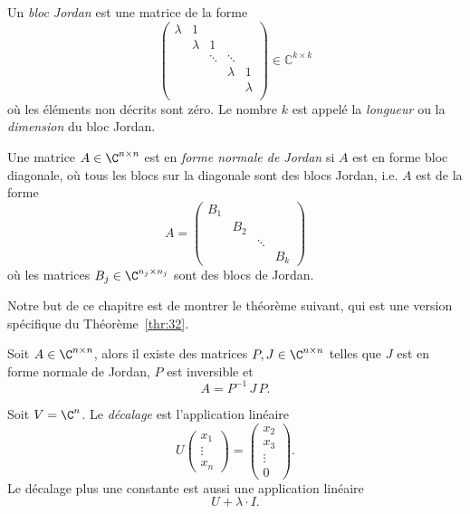 \begin{definition}
  Un \emph{bloc Jordan} est une matrice de la forme 
  \begin{displaymath}
    \begin{pmatrix}
      λ & 1 \\
        & λ & 1 \\
        &   & \ddots & \ddots \\ 
        &   &             & λ & 1 \\
        &   &         &  & λ  \\
    \end{pmatrix} ∈ ℂ^{k ×k} 
  \end{displaymath}
où les éléments non décrits sont zéro. Le nombre $k$ est appelé la \emph{longueur} ou la \emph{dimension} du bloc Jordan. 

Une matrice $A \in \C^{n \times n}$ est en \emph{forme normale de Jordan} si $A$ est en forme bloc diagonale, où tous les blocs sur la diagonale sont des blocs Jordan, i.e. $A$ est de la forme
\begin{displaymath}
  A =
  \begin{pmatrix}
    B_1 \\
        & B_2 \\
        &    & \ddots \\
        &    &       & B_k
  \end{pmatrix}
\end{displaymath}
où les matrices $B_j \in \C^{n_j\times n_j}$ sont des blocs de Jordan. 
\end{definition}


Notre but de ce chapitre  est de montrer le théorème suivant, qui est une version spécifique du  Théorème~\ref{thr:32}.

\begin{theorem}
  \label{thr:41}
  Soit $A \in \C^{n \times n}$, alors il existe des matrices $P,J \in \C^{n \times n}$ telles que $J$ est en forme normale de Jordan, $P$ est inversible et 
  \begin{displaymath}
    A = P^{-1} \,J \,P. 
  \end{displaymath}
\end{theorem}

\begin{definition}
  \label{def:36}
  Soit $V  = \C^n$. Le \emph{décalage}  est l'application linéaire 
  \begin{displaymath}
    U
    \begin{pmatrix}
      x_1 \\ \vdots \\ x_n
    \end{pmatrix}
     = 
     \begin{pmatrix}
       x_2 \\ x_3 \\ \vdots \\ 0
     \end{pmatrix}. 
  \end{displaymath}
  Le décalage plus une constante est aussi une application linéaire 
  \begin{displaymath}
    U + \lambda \cdot I. 
  \end{displaymath}
\end{definition}

